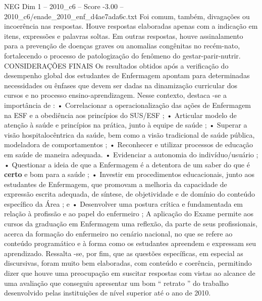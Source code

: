 \begin{textsample}{NEG Dim 1 – 2010\_c6 – Score -3.00 – 2010\_c6/enade\_2010\_enf\_d4ae7ada6c.txt}
Foi comum, também, divagações ou incoerência nas respostas.
Houve respostas elaboradas apenas com a indicação em itens, expressões e palavras soltas.
Em outras respostas, houve assinalamento para a prevenção de doenças graves ou anomalias congênitas no recém-nato, fortalecendo o processo de patologização do fenômeno do gestar-parir-nutrir.
CONSIDERAÇÕES FINAIS Os resultados obtidos após a verificação do desempenho global dos estudantes de Enfermagem apontam para determinadas necessidades ou ênfases que devem ser dadas na dinamização curricular dos cursos e no processo ensino-aprendizagem.
Nesse contexto, destaca -se a importância de : • Correlacionar a operacionalização das ações de Enfermagem na ESF e a obediência aos princípios do SUS/ESF ; • Articular modelo de atenção à saúde e princípios na prática, junto à equipe de saúde ; • Superar a visão hospitalocêntrica da saúde, bem como a visão tradicional de saúde pública, modeladora de comportamentos ; • Reconhecer e utilizar processos de educação em saúde de maneira adequada. • Evidenciar a autonomia do indivíduo/usuário ; • Questionar a ideia de que a Enfermagem é a detentora de um saber do que é \textbf{certo} e bom para a saúde ; • Investir em procedimentos educacionais, junto aos estudantes de Enfermagem, que promovam a melhoria da capacidade de expressão escrita adequada, de síntese, de objetividade e de domínio do conteúdo específico da Área ; e • Desenvolver uma postura crítica e fundamentada em relação à profissão e ao papel do enfermeiro ; A aplicação do Exame permite aos cursos da graduação em Enfermagem uma reflexão, da parte de seus profissionais, acerca da formação do enfermeiro no cenário nacional, no que se refere ao conteúdo programático e à forma como os estudantes apreendem e expressam seu aprendizado.
Ressalta -se, por fim, que as questões específicas, em especial as discursivas, foram muito bem elaboradas, com conteúdo e coerência, permitindo dizer que houve uma preocupação em suscitar respostas com vistas ao alcance de uma avaliação que conseguiu apresentar um bom “ retrato ” do trabalho desenvolvido pelas instituições de nível superior até o ano de 2010.

\end{textsample}
